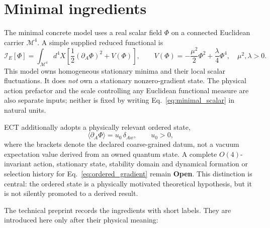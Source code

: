 \documentclass[11pt,a4paper]{article}
\newcommand{\statO}{\textbf{Open}}
\begin{document}
\section{Minimal ingredients}
\label{sec:ingredients}

The minimal concrete model uses a real scalar field $\Phi$ on a connected
Euclidean carrier $\mathcal M^4$.  A simple supplied reduced functional is
\begin{equation}
 \mathcal I_E[\Phi]=\int_{\mathcal M^4}d^4X
 \left[\frac12(\partial_A\Phi)^2+V(\Phi)\right],
 \qquad
 V(\Phi)=-\frac{\mu^2}{2}\Phi^2+\frac{\lambda}{4}\Phi^4,
 \quad \mu^2,\lambda>0 .
 \label{eq:minimal_scalar}
\end{equation}
This model owns homogeneous stationary minima and their local scalar
fluctuations.  It does \emph{not} own a stationary nonzero-gradient state.
The physical action prefactor and the scale controlling any Euclidean
functional measure are also separate inputs; neither is fixed by writing
Eq.~\eqref{eq:minimal_scalar} in natural units.

ECT additionally adopts a physically relevant ordered state,
\begin{equation}
 \langle\partial_A\Phi\rangle=u_0\,\delta_{Aw},
 \qquad u_0>0,
 \label{eq:ordered_gradient}
\end{equation}
where the brackets denote the declared coarse-grained datum, not a vacuum
expectation value derived from an owned quantum state.  A complete
$O(4)$-invariant action, stationary state, stability domain and dynamical
formation or selection history for Eq.~\eqref{eq:ordered_gradient} remain
\statO.  This distinction is central: the ordered state is a physically
motivated theoretical hypothesis, but it is not silently promoted to a
derived result.

The technical preprint records the ingredients with short labels.  They are
introduced here only after their physical meaning:
\end{document}
